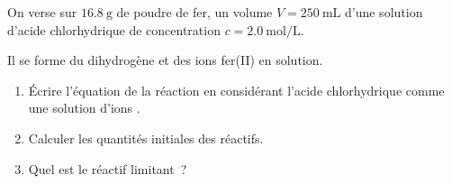 On verse sur $\qty{16.8}{\g}$ de poudre de fer, un volume $V=\qty{250}{\mL}$
d'une solution d'acide chlorhydrique de concentration $c=\qty{2.0}{\mol\per\L}$.

Il se forme du dihydrogène et des ions fer(II) en solution.
\begin{enumerate}
    \item Écrire l'équation de la réaction en considérant l'acide chlorhydrique
          comme une solution d'ions .
    \item Calculer les quantités initiales des réactifs.
    \item Quel est le réactif limitant~?
\end{enumerate}

